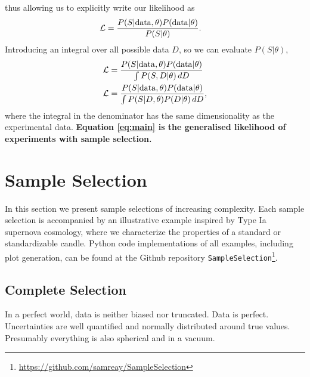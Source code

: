 \documentclass[a4paper,fleqn,usenatbib]{mnras}
\newcommand{\green}{\color{ForestGreen}}
\begin{document}
thus allowing us to explicitly write our likelihood as
\begin{align}
\mathcal{L}&= \frac{P(S|{\rm data},\theta) P({\rm data}|\theta)}{P(S|\theta)}.
\end{align}
Introducing an integral over all possible data $D$, so we can evaluate $P(S|\theta)$, 
\begin{align}
\mathcal{L}&= \frac{P(S|{\rm data},\theta) P({\rm data}|\theta)}{\int P(S, D|\theta)\, dD} \\
\mathcal{L} &= \frac{P(S|{\rm data},\theta) P({\rm data}|\theta)}{\int P(S | D, \theta) P(D|\theta)\, dD}, \label{eq:main}
\end{align}
where the integral in the denominator has the same dimensionality as the experimental data. \textbf{Equation \ref{eq:main} is the generalised likelihood of experiments with sample selection.}




\section{Sample Selection}
\label{sec:examples}

 In this section we present sample selections of increasing complexity. Each sample selection is accompanied by an illustrative example inspired by Type Ia supernova cosmology, where we characterize the properties of a standard or standardizable candle. {\green Python code implementations of all examples, including plot generation, can be found at the Github repository \verb|SampleSelection|\footnote{\url{https://github.com/samreay/SampleSelection}}.}
 
 
\subsection{Complete Selection}
\label{sec:perfect}
In a perfect world, data is neither biased nor truncated. Data is perfect. Uncertainties are well quantified and normally distributed around true values. Presumably everything is also spherical and in a vacuum.
\end{document}
